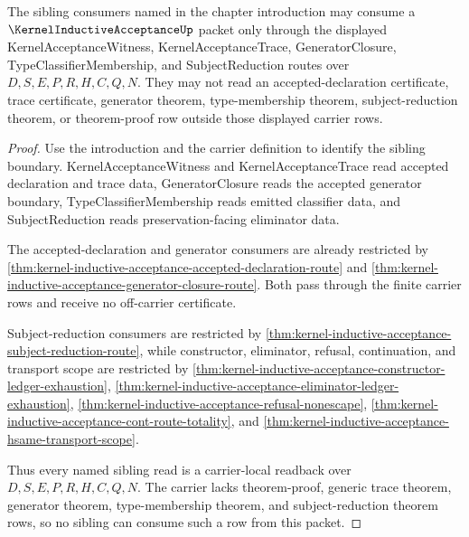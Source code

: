 \begin{theorem}
\label{thm:kernel-inductive-acceptance-sibling-consumer-scope}
The sibling consumers named in the chapter introduction may consume a $\KernelInductiveAcceptanceUp$ packet only through the displayed KernelAcceptanceWitness, KernelAcceptanceTrace, GeneratorClosure, TypeClassifierMembership, and SubjectReduction routes over $D,S,E,P,R,H,C,Q,N$. They may not read an accepted-declaration certificate, trace certificate, generator theorem, type-membership theorem, subject-reduction theorem, or theorem-proof row outside those displayed carrier rows.
\end{theorem}
\begin{proof}
Use the introduction and the carrier definition to identify the sibling boundary. KernelAcceptanceWitness and KernelAcceptanceTrace read accepted declaration and trace data, GeneratorClosure reads the accepted generator boundary, TypeClassifierMembership reads emitted classifier data, and SubjectReduction reads preservation-facing eliminator data.

The accepted-declaration and generator consumers are already restricted by \autoref{thm:kernel-inductive-acceptance-accepted-declaration-route} and \autoref{thm:kernel-inductive-acceptance-generator-closure-route}. Both pass through the finite carrier rows and receive no off-carrier certificate.

Subject-reduction consumers are restricted by \autoref{thm:kernel-inductive-acceptance-subject-reduction-route}, while constructor, eliminator, refusal, continuation, and transport scope are restricted by \autoref{thm:kernel-inductive-acceptance-constructor-ledger-exhaustion}, \autoref{thm:kernel-inductive-acceptance-eliminator-ledger-exhaustion}, \autoref{thm:kernel-inductive-acceptance-refusal-nonescape}, \autoref{thm:kernel-inductive-acceptance-cont-route-totality}, and \autoref{thm:kernel-inductive-acceptance-hsame-transport-scope}.

Thus every named sibling read is a carrier-local readback over $D,S,E,P,R,H,C,Q,N$. The carrier lacks theorem-proof, generic trace theorem, generator theorem, type-membership theorem, and subject-reduction theorem rows, so no sibling can consume such a row from this packet.
\end{proof}

